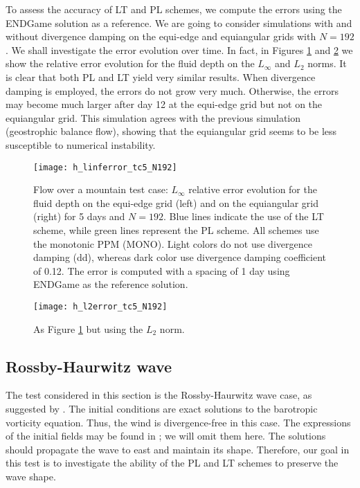 To assess the accuracy of LT and PL schemes, we compute the errors using the ENDGame solution as a reference.
We are going to consider simulations with and without divergence damping on the equi-edge and equiangular grids with $N=192$.
We shall investigate the error evolution over time.
In fact, in Figures \ref{sw-mountain-h-error-linf} and \ref{sw-mountain-h-error-l2} we show the relative error evolution
for the fluid depth on the $L_{\infty}$ and $L_2$ norms.
It is clear that both PL and LT yield very similar results.
When divergence damping is employed, the errors do not grow very much. 
Otherwise, the errors may become much larger after day 12 at the equi-edge grid but not on the equiangular grid.
This simulation agrees with the previous simulation (geostrophic balance flow),
showing that the equiangular grid seems to be less susceptible to numerical instability.


\newpage
\begin{figure}[!htb]
	\centering
	\texttt{[image: h\_linferror\_tc5\_N192]}
	\caption{Flow over a mountain test case:
	$L_{\infty}$ relative error evolution for the fluid depth on the equi-edge grid (left)
and on the equiangular grid (right) for 5 days and $N=192$.
Blue lines indicate the use of the LT scheme, while green lines represent the PL scheme.
All schemes use the monotonic PPM (MONO). 
Light colors do not use divergence damping (dd), whereas dark color use divergence damping coefficient of 0.12.
The error is computed with a spacing of 1 day using ENDGame as the reference solution.
\label{sw-mountain-h-error-linf}}
\end{figure}

\begin{figure}[!htb]
	\centering
	\texttt{[image: h\_l2error\_tc5\_N192]}
	\caption{As Figure \ref{sw-mountain-h-error-linf} but using the $L_2$ norm.
		\label{sw-mountain-h-error-l2}}
\end{figure}

\newpage
\subsection{Rossby-Haurwitz wave}
The test considered in this section is the Rossby-Haurwitz wave case, as suggested by \citet{will:1992}.
The initial conditions are exact solutions to the barotropic vorticity equation.
Thus, the wind is divergence-free in this case.
The expressions of the initial fields may be found in \citet{will:1992}; we will omit them here.
The solutions should propagate the wave to east and maintain its shape.
Therefore, our goal in this test is to investigate the ability of the PL and LT schemes to preserve the wave shape.

